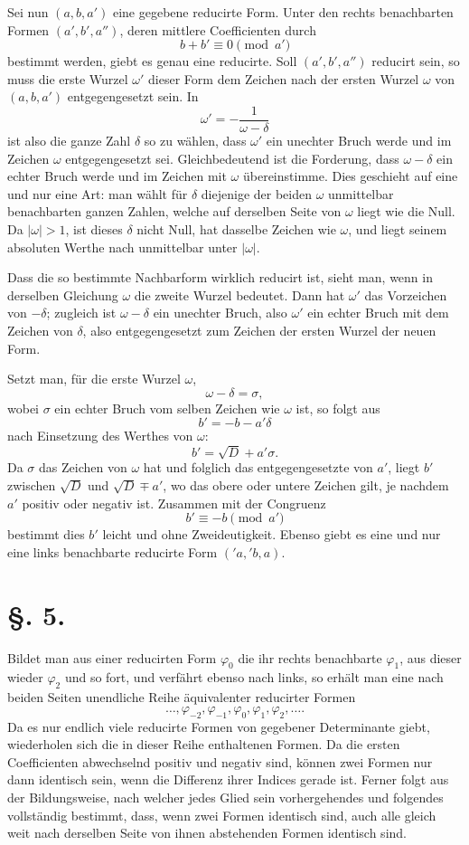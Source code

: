 \documentclass[11pt]{article}
\begin{document}
Sei nun $(a,b,a')$ eine gegebene reducirte Form. Unter den rechts benachbarten Formen $(a',b',a'')$, deren mittlere Coefficienten durch
\[
 b+b'\equiv0\pmod {a'}
\]
bestimmt werden, giebt es genau eine reducirte. Soll $(a',b',a'')$ reducirt sein, so muss die erste Wurzel $\omega'$ dieser Form dem Zeichen nach der ersten Wurzel $\omega$ von $(a,b,a')$ entgegengesetzt sein. In
\[
 \omega'=-\frac1{\omega-\delta}
\]
ist also die ganze Zahl $\delta$ so zu wählen, dass $\omega'$ ein unechter Bruch werde und im Zeichen $\omega$ entgegengesetzt sei. Gleichbedeutend ist die Forderung, dass $\omega-\delta$ ein echter Bruch werde und im Zeichen mit $\omega$ übereinstimme. Dies geschieht auf eine und nur eine Art: man wählt für $\delta$ diejenige der beiden $\omega$ unmittelbar benachbarten ganzen Zahlen, welche auf derselben Seite von $\omega$ liegt wie die Null. Da $|\omega|>1$, ist dieses $\delta$ nicht Null, hat dasselbe Zeichen wie $\omega$, und liegt seinem absoluten Werthe nach unmittelbar unter $|\omega|$.

Dass die so bestimmte Nachbarform wirklich reducirt ist, sieht man, wenn in derselben Gleichung $\omega$ die zweite Wurzel bedeutet. Dann hat $\omega'$ das Vorzeichen von $-\delta$; zugleich ist $\omega-\delta$ ein unechter Bruch, also $\omega'$ ein echter Bruch mit dem Zeichen von $\delta$, also entgegengesetzt zum Zeichen der ersten Wurzel der neuen Form.

Setzt man, für die erste Wurzel $\omega$,
\[
 \omega-\delta=\sigma,
\]
wobei $\sigma$ ein echter Bruch vom selben Zeichen wie $\omega$ ist, so folgt aus
\[
 b'=-b-a'\delta
\]
nach Einsetzung des Werthes von $\omega$:
\[
 b'=\sqrt D+a'\sigma.
\]
Da $\sigma$ das Zeichen von $\omega$ hat und folglich das entgegengesetzte von $a'$, liegt $b'$ zwischen $\sqrt D$ und $\sqrt D\mp a'$, wo das obere oder untere Zeichen gilt, je nachdem $a'$ positiv oder negativ ist. Zusammen mit der Congruenz
\[
 b'\equiv -b\pmod {a'}
\]
bestimmt dies $b'$ leicht und ohne Zweideutigkeit. Ebenso giebt es eine und nur eine links benachbarte reducirte Form $({}'a,{}'b,a)$.

\section*{\S. 5.}

Bildet man aus einer reducirten Form $\varphi_0$ die ihr rechts benachbarte $\varphi_1$, aus dieser wieder $\varphi_2$ und so fort, und verfährt ebenso nach links, so erhält man eine nach beiden Seiten unendliche Reihe äquivalenter reducirter Formen
\[
 \ldots,\varphi_{-2},\varphi_{-1},\varphi_0,
 \varphi_1,\varphi_2,\ldots.
\]
Da es nur endlich viele reducirte Formen von gegebener Determinante giebt, wiederholen sich die in dieser Reihe enthaltenen Formen. Da die ersten Coefficienten abwechselnd positiv und negativ sind, können zwei Formen nur dann identisch sein, wenn die Differenz ihrer Indices gerade ist. Ferner folgt aus der Bildungsweise, nach welcher jedes Glied sein vorhergehendes und folgendes vollständig bestimmt, dass, wenn zwei Formen identisch sind, auch alle gleich weit nach derselben Seite von ihnen abstehenden Formen identisch sind.
\end{document}
